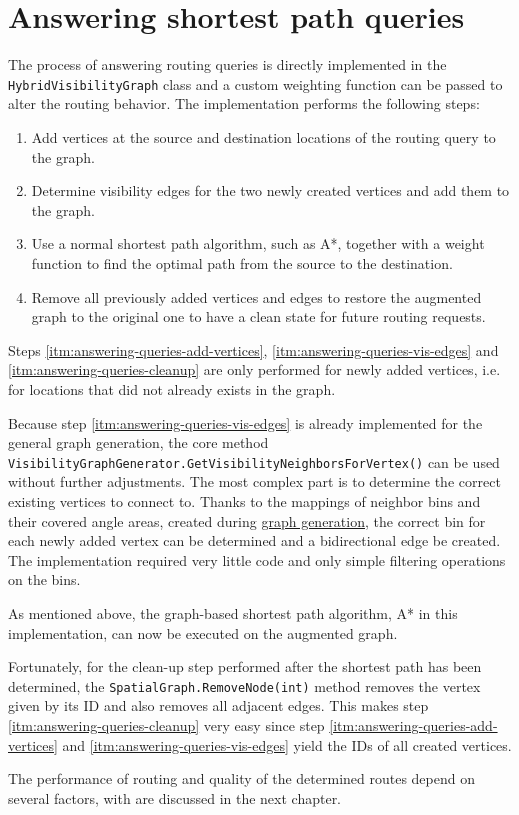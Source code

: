 \section{Answering shortest path queries}
\label{sec:answering-queries}

	The process of answering routing queries is directly implemented in the \texttt{HybridVisibilityGraph} class and a custom weighting function can be passed to alter the routing behavior.
	The implementation performs the following steps:
	\begin{enumerate}
		\item \label{itm:answering-queries-add-vertices} Add vertices at the source and destination locations of the routing query to the graph.
		\item \label{itm:answering-queries-vis-edges} Determine visibility edges for the two newly created vertices and add them to the graph.
		\item \label{itm:answering-queries-routing} Use a normal shortest path algorithm, such as A*, together with a weight function to find the optimal path from the source to the destination.
		\item \label{itm:answering-queries-cleanup} Remove all previously added vertices and edges to restore the augmented graph to the original one to have a clean state for future routing requests.
	\end{enumerate}
	Steps \ref{itm:answering-queries-add-vertices}, \ref{itm:answering-queries-vis-edges} and \ref{itm:answering-queries-cleanup} are only performed for newly added vertices, i.e. for locations that did not already exists in the graph.
	
	Because step \ref{itm:answering-queries-vis-edges} is already implemented for the general graph generation, the core method \texttt{VisibilityGraphGenerator.GetVisibilityNeighborsForVertex()} can be used without further adjustments.
	The most complex part is to determine the correct existing vertices to connect to.
	Thanks to the mappings of neighbor bins and their covered angle areas, created during \hyperref[subsec:step-3-graph-creation]{graph generation}, the correct bin for each newly added vertex can be determined and a bidirectional edge be created.
	The implementation required very little code and only simple filtering operations on the bins.
	
	As mentioned above, the graph-based shortest path algorithm, A* in this implementation, can now be executed on the augmented graph.
	
	Fortunately, for the clean-up step performed after the shortest path has been determined, the \texttt{SpatialGraph.RemoveNode(int)} method removes the vertex given by its ID and also removes all adjacent edges.
	This makes step \ref{itm:answering-queries-cleanup} very easy since step \ref{itm:answering-queries-add-vertices} and \ref{itm:answering-queries-vis-edges} yield the IDs of all created vertices.
	
	The performance of routing and quality of the determined routes depend on several factors, with are discussed in the next chapter.